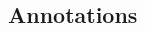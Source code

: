 \documentclass{beamer}
\begin{document}
\begin{frame}[fragile]
\begin{columns}
  \begin{column}{3.5cm}
    \begin{overlayarea}{3.5cm}{7cm}
    \end{overlayarea}
  \end{column}

\end{columns}

\end{frame}

\subsection*{Annotations}
\end{document}
